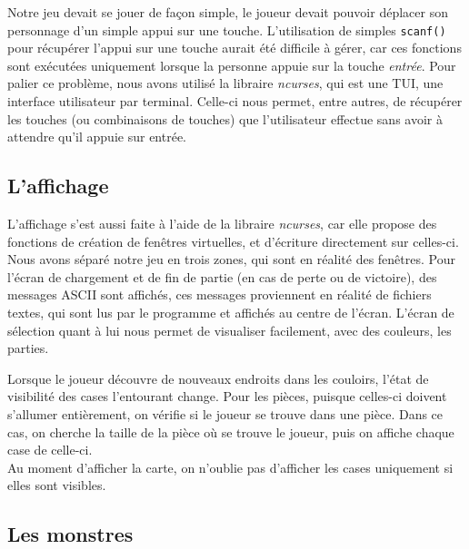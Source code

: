 \documentclass[11pt]{report}
\begin{document}
		
			Notre jeu devait se jouer de façon simple, le joueur devait pouvoir déplacer son personnage d'un simple appui sur une touche. L'utilisation de simples \texttt{scanf()} pour récupérer l'appui sur une touche aurait été difficile à gérer, car ces fonctions sont exécutées uniquement lorsque la personne appuie sur la touche \textit{entrée}. Pour palier ce problème, nous avons utilisé la libraire \emph{ncurses}, qui est une \textsc{TUI}, une interface utilisateur par terminal. Celle-ci nous permet, entre autres, de récupérer les touches (ou combinaisons de touches) que l'utilisateur effectue sans avoir à attendre qu'il appuie sur entrée.
			
			
		\subsection{L'affichage}
		
		L'affichage s'est aussi faite à l'aide de la libraire \emph{ncurses}, car elle propose des fonctions de création de fenêtres virtuelles, et d'écriture directement sur celles-ci. Nous avons séparé notre jeu en trois zones, qui sont en réalité des fenêtres. Pour l'écran de chargement et de fin de partie (en cas de perte ou de victoire), des messages ASCII sont affichés, ces messages proviennent en réalité de fichiers textes, qui sont lus par le programme et affichés au centre de l'écran. L'écran de sélection quant à lui nous permet de visualiser facilement, avec des couleurs, les parties.
		
		\vspace{12pt}
		
		Lorsque le joueur découvre de nouveaux endroits dans les couloirs, l'état de visibilité des cases l'entourant change. Pour les pièces, puisque celles-ci doivent s'allumer entièrement, on vérifie si le joueur se trouve dans une pièce. Dans ce cas, on cherche la taille de la pièce où se trouve le joueur, puis on affiche chaque case de celle-ci.\\
		Au moment d'afficher la carte, on n'oublie pas d'afficher les cases uniquement si elles sont visibles.
		
		\subsection{Les monstres}
		
\end{document}
